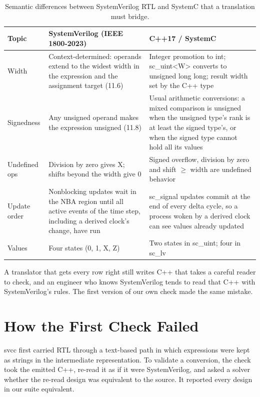 \documentclass[conference]{IEEEtran}
\newcommand{\code}[1]{{\fontshape{n}\ttfamily #1}}
\begin{document}
\begin{table}[t]
\centering
\caption{Semantic differences between SystemVerilog RTL and SystemC that a translation must bridge.}
\label{tab:diff}
\footnotesize
\setlength{\tabcolsep}{3pt}
\begin{tabularx}{\columnwidth}{@{}>{\raggedright\arraybackslash}p{} >{\raggedright\arraybackslash}X >{\raggedright\arraybackslash}X@{}}
\toprule
Topic & SystemVerilog (IEEE 1800-2023) & C++17 / SystemC \\
\midrule
Width & Context-determined: operands extend to the widest width in the expression and the assignment target (11.6) & Integer promotion to \code{int}; \code{sc\_uint<W>} converts to \code{unsigned long long}; result width set by the C++ type \\
Signedness & Any unsigned operand makes the expression unsigned (11.8) & Usual arithmetic conversions: a mixed comparison is unsigned when the unsigned type's rank is at least the signed type's, or when the signed type cannot hold all its values \\
Undefined ops & Division by zero gives X; shifts beyond the width give 0 & Signed overflow, division by zero and shift $\ge$ width are undefined behavior \\
Update order & Nonblocking updates wait in the NBA region until all active events of the time step, including a derived clock's change, have run & \code{sc\_signal} updates commit at the end of every delta cycle, so a process woken by a derived clock can see values already updated \\
Values & Four states (0, 1, X, Z) & Two states in \code{sc\_uint}; four in \code{sc\_lv} \\
\bottomrule
\end{tabularx}
\end{table}

A translator that gets every row right still writes C++ that takes a careful reader to check, and
an engineer who knows SystemVerilog tends to read that C++ with SystemVerilog's rules. The first
version of our own check made the same mistake.

\section{How the First Check Failed}
\label{sec:failure}

\code{svcc} first carried RTL through a text-based path in which expressions were kept as strings
in the intermediate representation. To validate a conversion, the check took the emitted C++,
re-read it as if it were SystemVerilog, and asked a solver whether the re-read design was
equivalent to the source. It reported every design in our suite equivalent.
\end{document}
